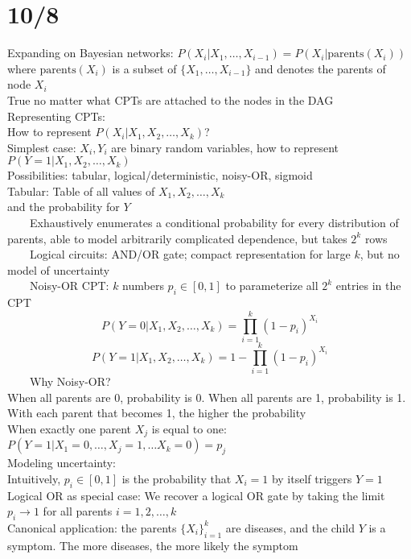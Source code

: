 \documentclass[10pt,letterpaper,unboxed,cm]{article}
\newcommand{\tab}{~~~~}
\begin{document}
\section{10/8}
Expanding on Bayesian networks: $P(X_i|X_1, \ldots, X_{i-1}) = P(X_i|\text{parents}(X_i))$\\
where $\text{parents}(X_i)$ is a subset of $\{X_1, \ldots, X_{i-1}\}$ and denotes the parents of node $X_i$\\
True no matter what CPTs are attached to the nodes in the DAG\\
Representing CPTs:\\
How to represent $P(X_i|X_1, X_2, \ldots, X_k)$?\\
Simplest case: $X_i, Y_i$ are binary random variables, how to represent $P(Y = 1|X_1, X_2, \ldots, X_k)$\\
Possibilities: tabular, logical/deterministic, noisy-OR, sigmoid\\
Tabular: Table of all values of $X_1, X_2, \ldots, X_k$\\ and the probability for $Y$\\
\tab Exhaustively enumerates a conditional probability for every distribution of parents, able to model arbitrarily complicated dependence, but takes $2^k$ rows\\
\tab Logical circuits: AND/OR gate; compact representation for large $k$, but no model of uncertainty\\
\tab Noisy-OR CPT: $k$ numbers $p_i \in [0, 1]$ to parameterize all $2^k$ entries in the CPT\\
$$P(Y = 0|X_1, X_2, \ldots, X_k) = \prod_{i=1}^k(1 - p_i)^{X_i}$$
$$P(Y = 1|X_1, X_2, \ldots, X_k) = 1 - \prod_{i=1}^k(1 - p_i)^{X_i}$$
\tab Why Noisy-OR?\\
When all parents are 0, probability is 0. When all parents are 1, probability is 1.\\
With each parent that becomes 1, the higher the probability\\
When exactly one parent $X_j$ is equal to one: $P(Y = 1|X_1 = 0, \ldots, X_j = 1, \ldots X_k = 0) = p_j$\\
Modeling uncertainty: \\
Intuitively, $p_i \in [0,1]$ is the probability that $X_i = 1$ by itself triggers $Y=1$\\
Logical OR as special case: We recover a logical OR gate by taking the limit $p_i \to 1$ for all parents $i = 1,2,\ldots,k$\\
Canonical application: the parents $\{X_i\}^k_{i=1}$ are diseases, and the child $Y$ is a symptom. The more diseases, the more likely the symptom\\
\end{document}
